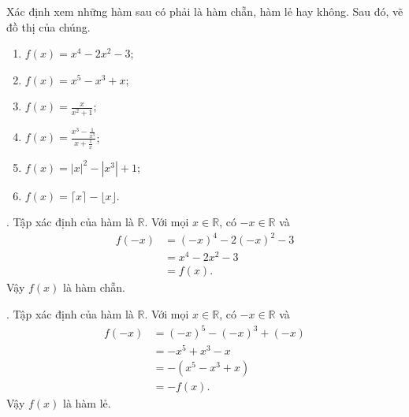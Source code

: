 \exercise Xác định xem những hàm sau có phải là hàm chẵn, hàm lẻ hay không. Sau đó, vẽ đồ thị của chúng.
\begin{multicols}{2}
   \begin{enumerate}
      \item $f(x) = x^4 - 2x^2 - 3$;
      \item $f(x) = x^5 - x^3 + x$;
      \item $f(x) = \frac{x}{x^2 + 1}$;
      \item $f(x) = \frac{x^3 - \frac{1}{x^3}}{x + \frac{1}{x}}$;
      \item $f(x) = |x|^2 - \left|x^3\right| + 1$;
      \item $f(x) = \lceil x \rceil - \lfloor x \rfloor$.
   \end{enumerate}
\end{multicols}

\solution 

\setcounter{subexercise}{1}
. Tập xác định của hàm là $\mathbb{R}$. Với mọi $x \in \mathbb{R}$, có $-x \in \mathbb{R}$ và
\begin{align*}
   f(-x) &= (-x)^4 - 2(-x)^2 - 3\\
   &= x^4 - 2x^2 - 3\\
   &= f(x).
\end{align*}
Vậy $f(x)$ là hàm chẵn.

. Tập xác định của hàm là $\mathbb{R}$. Với mọi $x \in \mathbb{R}$, có $-x \in \mathbb{R}$ và
\begin{align*}
   f(-x) &= (-x)^5 - (-x)^3 + (-x)\\
   &= -x^5 + x^3 - x\\
   &= -\left(x^5 - x^3 + x\right)\\
   &= -f(x).
\end{align*}
Vậy $f(x)$ là hàm lẻ.

